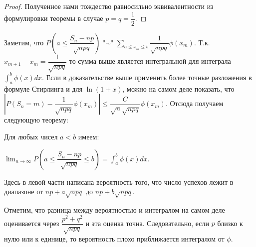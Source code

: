 \documentclass[a4paper]{article}
\begin{document}
\begin{colloq}
\begin{proof}
		Полученное нами тождество равносильно эквивалентности из формулировки теоремы в случае $p = q = \dfrac{1}{2}$.
	\end{proof}

	Заметим, что $P \left(a \leqslant \dfrac{S_n - np}{\sqrt{npq}} \right)$ "$\sim$" $\sum_{a \leqslant x_m \leqslant b} \dfrac{1}{\sqrt{npq}}\phi(x_m)$. Т.к. $x_{m+1} - x_m = \dfrac{1}{\sqrt{npq}}$ то сумма выше является интегральной для интеграла $\int_a^b \phi(x) dx$. Если в доказательстве выше применить более точные разложения в формуле Стирлинга и для $\ln (1 + x)$, можно на самом деле показать, что $\left|P(S_n = m) - \dfrac{1}{\sqrt{npq}} \phi(x_m) \right| \leqslant \dfrac{C}{\sqrt{n}\sqrt{npq}} \phi(x_m)$. Отсюда получаем следующую теорему:
	
	\begin{theorem}
		Для любых чисел $a < b$ имеем:
		
		$\lim_{n \rightarrow \infty} P\left( a \leqslant \dfrac{S_n - np}{\sqrt{npq}} \leqslant b \right) = \int_a^b \phi(x) dx$.
		
		Здесь в левой части написана вероятность того, что число успехов лежит в диапазоне от $np + a\sqrt{npq}$ до $np + b\sqrt{npq}$.
	\end{theorem}

	Отметим, что разница между вероятностью и интегралом на самом деле оценивается через $\dfrac{p^2 + q^2}{\sqrt{npq}}$ и эта оценка точна. Следовательно, если $p$ близко к нулю или к единице, то	вероятность плохо приближается интегралом от $\phi$.

    \end{colloq}
\end{document}
